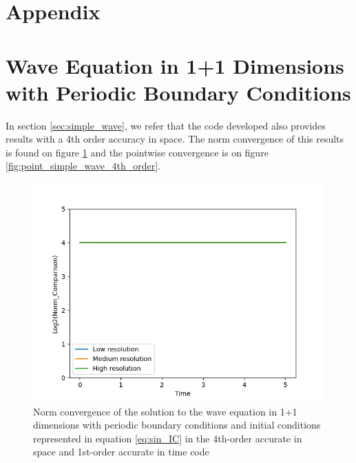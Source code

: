 \section*{Appendix}
\section{Wave Equation in 1+1 Dimensions with Periodic Boundary Conditions}

In section \ref{sec:simple_wave}, we refer that the code developed also provides results with a 4th order accuracy in space. The norm convergence of this results is found on figure \ref{fig:norm_simple_wave_4th_order} and the pointwise convergence is on figure \ref{fig:point_simple_wave_4th_order}.

\begin{figure}[H]
    \centering
    \includegraphics[width=0.9\columnwidth]{Images/simple_wave-4th-norm.png}
    \caption{Norm convergence of the solution to the wave equation in 1+1 dimensions with periodic boundary conditions and initial conditions represented in equation \ref{eq:sin_IC} in the 4th-order accurate in space and 1st-order accurate in time code}
    \label{fig:norm_simple_wave_4th_order}
\end{figure}

